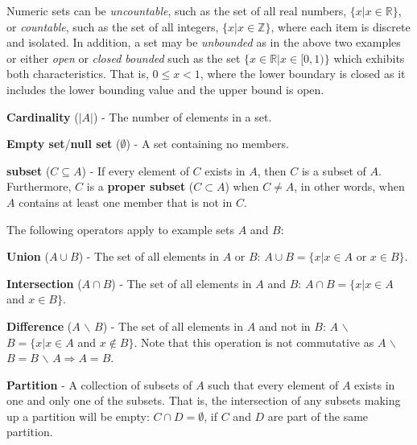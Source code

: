 Numeric sets can be \emph{uncountable}, such as the set of all real numbers, $\{x| x \in \mathbb{R}\}$, or \emph{countable}, such as the set of all integers, $\{x| x \in \mathbb{Z}\}$, where each item is discrete and isolated.
%
In addition, a set may be \emph{unbounded} as in the above two examples or either \emph{open} or \emph{closed bounded} such as the set $\{x \in \mathbb{R} | x \in [0,1)\}$ which exhibits both characteristics.
%
That is, $0 \le x < 1$, where the lower boundary is closed as it includes the lower bounding value and the upper bound is open.

\begin{defn}
  \textbf{Cardinality} ($|A|$) - The number of elements in a set.
\end{defn}

\begin{defn}
  \textbf{Empty set}/\textbf{null set} ($\emptyset$) - A set containing no members.
\end{defn}

\begin{defn}
  \textbf{subset} ($C \subseteq A$) - If every element of $C$ exists in $A$, then $C$ is a subset of $A$.
  Furthermore, $C$ is a \textbf{proper subset} ($C \subset A$) when $C \neq A$, in other words, when $A$ contains at least one member that is not in $C$.
\end{defn}

The following operators apply to example sets $A$ and $B$:

\begin{defn}
  \textbf{Union} ($A \cup B$) - The set of all elements in $A$ or $B$: $A \cup B = \{x| x \in A$ or $x \in B\}$.
\end{defn}

\begin{defn}
  \textbf{Intersection} ($A \cap B$) - The set of all elements in $A$ and $B$: $A \cap B = \{x| x \in A$ and $x \in B\}$.
\end{defn}

\begin{defn}
  \textbf{Difference} ($A$ $\backslash$ $B$) - The set of all elements in $A$ and not in $B$: $A$ $\backslash$ $B = \{x| x \in A$ and $x \notin B\}$.
  Note that this operation is not commutative as $A$ $\backslash$ $B = B$ $\backslash$ $A \Rightarrow A = B$.
\end{defn}

\begin{defn}
  \textbf{Partition} - A collection of subsets of $A$ such that every element of $A$ exists in one and only one of the subsets.
  That is, the intersection of any subsets making up a partition will be empty: $C \cap D = \emptyset$, if $C$ and $D$ are part of the same partition.
\end{defn}

